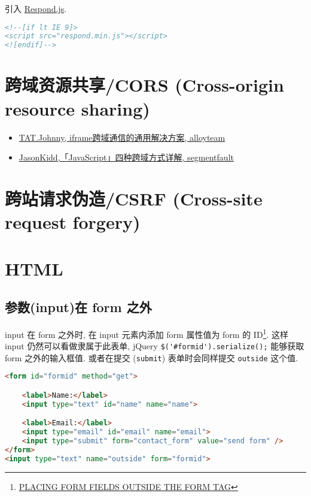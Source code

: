 引入 \href{https://github.com/scottjehl/Respond}{Respond.js}.

\begin{lstlisting}[language=HTML]
<!--[if lt IE 9]>
<script src="respond.min.js"></script>
<![endif]-->
\end{lstlisting}

\section{跨域资源共享/CORS (Cross-origin resource
sharing)}\label{ux8de8ux57dfux8d44ux6e90ux5171ux4eabcors-cross-origin-resource-sharing}

\begin{itemize}
\tightlist
\item
  \href{http://www.alloyteam.com/2013/11/the-second-version-universal-solution-iframe-cross-domain-communication/}{TAT.Johnny,
  iframe跨域通信的通用解决方案, alloyteam}
\item
  \href{http://segmentfault.com/a/1190000003642057}{JasonKidd,「JavaScript」四种跨域方式详解,
  segmentfault}
\end{itemize}

\section{跨站请求伪造/CSRF (Cross-site request
forgery)}\label{ux8de8ux7ad9ux8bf7ux6c42ux4f2aux9020csrf-cross-site-request-forgery}

\section{HTML}\label{html}

\subsection{参数(input)在 form
之外}\label{ux53c2ux6570inputux5728-form-ux4e4bux5916}

input 在 form 之外时, 在 input 元素内添加 form 属性值为 form 的
ID\footnote{\href{http://www.dreamdealer.nl/articles/form_fields_outside_a_form.html}{PLACING
  FORM FIELDS OUTSIDE THE FORM TAG}}. 这样 input
仍然可以看做隶属于此表单, jQuery \lstinline!$('#formid').serialize();!
能够获取 form 之外的输入框值. 或者在提交 (\lstinline!submit!)
表单时会同样提交 \lstinline!outside! 这个值.

\begin{lstlisting}[language=HTML]
<form id="formid" method="get">

    <label>Name:</label>
    <input type="text" id="name" name="name">

    <label>Email:</label>
    <input type="email" id="email" name="email">
    <input type="submit" form="contact_form" value="send form" />
</form>
<input type="text" name="outside" form="formid">
\end{lstlisting}


